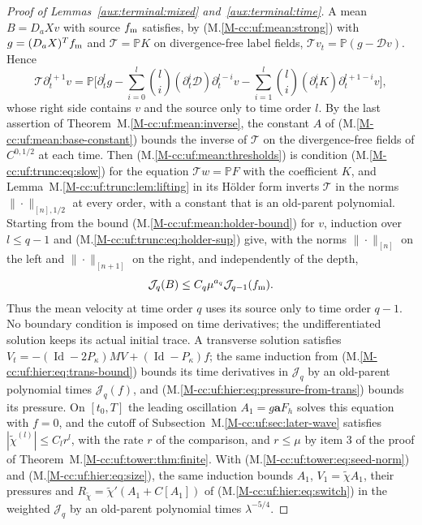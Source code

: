 \documentclass[11pt]{amsart}
\numberwithin{equation}{section}
\newcommand{\Holder}[1]{C^{#1,1/2}}
\newcommand{\Id}{\operatorname{Id}}
\newcommand{\PP}{\mathbb P}
\begin{document}
\begin{proof}[Proof of Lemmas~\ref{aux:terminal:mixed} and~\ref{aux:terminal:time}]
A mean $B=D_aX v$ with source $f_{\rm m}$ satisfies, by
\textup{(M.\ref{M-cc:uf:mean:strong})} with $g=(D_aX)^Tf_{\rm m}$ and $\mathcal T=\PP K$
on divergence-free label fields, $\mathcal Tv_t=\PP(g-\mathcal Dv)$. Hence
\[
 \mathcal T\partial_t^{l+1}v=\PP\Big[\partial_t^l g
 -\sum_{i=0}^l\binom li(\partial_t^i\mathcal D)\partial_t^{l-i}v
 -\sum_{i=1}^l\binom li(\partial_t^iK)\partial_t^{l+1-i}v\Big],
\]
whose right side contains $v$ and the source only to time order $l$.
By the last assertion of Theorem~M.\ref{M-cc:uf:mean:inverse}, the
constant $A$ of \textup{(M.\ref{M-cc:uf:mean:base-constant})} bounds the
inverse of $\mathcal T$ on the divergence-free fields of $\Holder{0}$ at each
time. Then \textup{(M.\ref{M-cc:uf:mean:thresholds})} is condition
\textup{(M.\ref{M-cc:uf:trunc:eq:slow})} for the equation
$\mathcal Tw=\PP F$ with the coefficient $K$, and
Lemma~M.\ref{M-cc:uf:trunc:lem:lifting} in its H\"older form inverts
$\mathcal T$ in the norms $\|\cdot\|_{[n],1/2}$ at every order, with a
constant that is an old-parent polynomial.
Starting from the bound
\textup{(M.\ref{M-cc:uf:mean:holder-bound})} for $v$, induction over
$l\le q-1$ and \textup{(M.\ref{M-cc:uf:trunc:eq:holder-sup})} give, with
the norms $\|\cdot\|_{[n]}$ on the left and $\|\cdot\|_{[n+1]}$ on the
right, and independently of the depth,
\begin{equation}\label{aux:terminal:mean-gain}
 \mathcal J_q(B)\le C_q\mu^{a_q}\mathcal J_{q-1}(f_{\rm m}).
\end{equation}
Thus the mean velocity at time order $q$ uses its source only to time
order $q-1$.
No boundary condition is imposed on time derivatives; the undifferentiated
solution keeps its actual initial trace. A transverse solution satisfies
$V_t=-(\Id-2P_\kappa)MV+(\Id-P_\kappa)f$; the same induction from
\textup{(M.\ref{M-cc:uf:hier:eq:trans-bound})} bounds its time derivatives
in $\mathcal J_q$ by an old-parent polynomial times $\mathcal J_q(f)$, and
\textup{(M.\ref{M-cc:uf:hier:eq:pressure-from-trans})} bounds its
pressure. On $[t_0,T]$ the leading
oscillation $A_1=g\mathbf aF_h$ solves this equation with $f=0$, and the cutoff of
Subsection~M.\ref{M-cc:uf:sec:later-wave} satisfies $|\widetilde\chi^{(l)}|\le C_lr^l$,
with the rate $r$ of the comparison,
and $r\le\mu$ by item 3 of the proof of
Theorem~M.\ref{M-cc:uf:tower:thm:finite}. With
\textup{(M.\ref{M-cc:uf:tower:eq:seed-norm})} and
\textup{(M.\ref{M-cc:uf:hier:eq:size})}, the same induction bounds
$A_1$, $V_1=\widetilde\chi A_1$, their pressures and
$R_{\widetilde\chi}=\widetilde\chi'(A_1+C[A_1])$ of \textup{(M.\ref{M-cc:uf:hier:eq:switch})}
in the weighted $\mathcal J_q$ by an old-parent polynomial times
$\lambda^{-5/4}$.


\end{proof}
\end{document}

